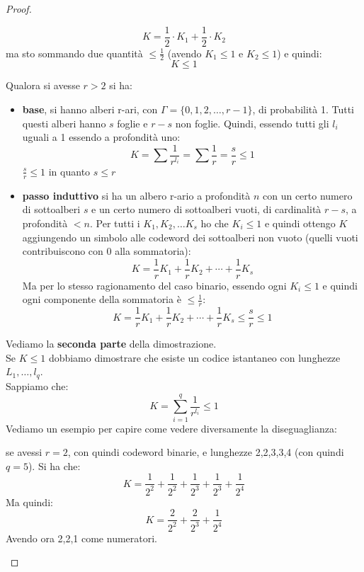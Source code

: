 \documentclass[a4paper,12pt, oneside]{book}
\begin{document}
\begin{proof}
\begin{itemize}
    \[K=\frac{1}{2}\cdot K_1+\frac{1}{2}\cdot K_2\]
    ma sto sommando due quantità $\leq \frac{1}{2}$ (avendo $K_1\leq 1$ e
    $K_2\leq 1$) e quindi: 
    \[K\leq 1\]
  \end{itemize}
  Qualora si avesse $r>2$ si ha:
  \begin{itemize}
    \item \textbf{base}, si hanno alberi r-ari, con
    $\Gamma=\{0,1,2,\ldots,r-1\}$, di probabilità 1. Tutti questi alberi hanno
    $s$ foglie e $r-s$ non foglie. Quindi, essendo tutti gli $l_i$ uguali a 1
    essendo a profondità uno:
    \[K=\sum \frac{1}{r^{l_i}}=\sum \frac{1}{r}=\frac{s}{r}\leq 1\]
    $\frac{s}{r}\leq 1$ in quanto $s\leq r$
    \item \textbf{passo induttivo} si ha un albero r-ario a profondità $n$ con
    un certo numero di sottoalberi $s$ e un certo numero di sottoalberi vuoti,
    di cardinalità $r-s$, a profondità $<n$. Per tutti i $K_1,K_2,\ldots K_s$
    ho che $K_i\leq 1$ e quindi ottengo $K$ aggiungendo un simbolo alle codeword 
    dei sottoalberi non vuoto (quelli vuoti contribuiscono con 0 alla
    sommatoria): 
    \[K=\frac{1}{r}K_1+\frac{1}{r}K_2+\cdots+\frac{1}{r}K_s\]
    Ma per lo stesso ragionamento del caso binario, essendo ogni $K_i\leq 1$ e
    quindi ogni componente della sommatoria è $\leq \frac{1}{r}$:
    \[K=\frac{1}{r}K_1+\frac{1}{r}K_2+\cdots+\frac{1}{r}K_s\leq \frac{s}{r}\leq
      1\] 
  \end{itemize}
  Vediamo la \textbf{seconda parte} della dimostrazione.\\
  Se $K\leq 1$ dobbiamo dimostrare che esiste un codice istantaneo con lunghezze
  $L_1,\ldots, l_q$.\\
  Sappiamo che:
  \[K=\sum_{i=1}^q\frac{1}{r^{l_i}}\leq 1\]
  Vediamo un esempio per capire come vedere diversamente la diseguaglianza:
  \begin{esempio}
    se avessi $r=2$, con quindi codeword binarie, e lunghezze 2,2,3,3,4 (con
    quindi $q=5$). Si ha che: 
    \[K=\frac{1}{2^2}+\frac{1}{2^2}+\frac{1}{2^3}+\frac{1}{2^3}+\frac{1}{2^4}\]
    Ma quindi:
    \[K=\frac{2}{2^2}+\frac{2}{2^3}+\frac{1}{2^4}\]
    Avendo ora 2,2,1 come numeratori.
  \end{esempio}


\end{proof}
\end{document}
